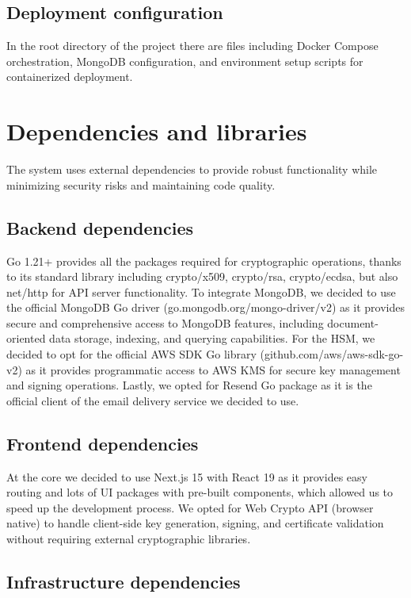 \subsection{Deployment configuration}
In the root directory of the project there are files including Docker Compose 
orchestration, MongoDB configuration, and environment setup scripts for 
containerized deployment.

\section{Dependencies and libraries}

The system uses external dependencies to provide robust functionality 
while minimizing security risks and maintaining code quality.

\subsection{Backend dependencies}
Go 1.21+ provides all the packages required for cryptographic operations, thanks to 
its standard library including crypto/x509, crypto/rsa, crypto/ecdsa, but also net/http 
for API server functionality.
To integrate MongoDB, we decided to use the official MongoDB Go driver (go.mongodb.org/mongo-driver/v2) 
as it provides secure and comprehensive access to MongoDB features, including 
document-oriented data storage, indexing, and querying capabilities.
For the HSM, we decided to opt for the official AWS SDK Go library (github.com/aws/aws-sdk-go-v2) 
as it provides programmatic access to AWS KMS for secure key management and signing 
operations.
Lastly, we opted for Resend Go package as it is the official client of the email delivery service
we decided to use.


\subsection{Frontend dependencies}

At the core we decided to use Next.js 15 with React 19 as it provides easy routing and
lots of UI packages with pre-built components, which allowed us to speed up the development process.
We opted for Web Crypto API (browser native) to handle 
client-side key generation, signing, and certificate validation without requiring 
external cryptographic libraries.

\subsection{Infrastructure dependencies}

